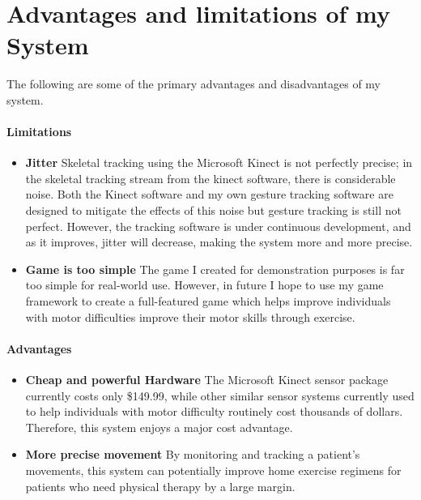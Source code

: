 \documentclass{article}
\begin{document}
\section{Advantages and limitations of my System}

The following are some of the primary advantages and disadvantages of my system.

\paragraph{Limitations}

\begin{itemize}
	\item \textbf{Jitter} Skeletal tracking using the Microsoft Kinect is not perfectly precise; in the skeletal tracking stream from the kinect software, there is considerable noise. Both the Kinect software and my own gesture tracking software are designed to mitigate the effects of this noise but gesture tracking is still not perfect. However, the tracking software is under continuous development, and as it improves, jitter will decrease, making the system more and more precise.

	\item \textbf{Game is too simple} The game I created for demonstration purposes is far too simple for real-world use. However, in future I hope to use my game framework to create a full-featured game which helps improve individuals with motor difficulties improve their motor skills through exercise.
\end{itemize}

\paragraph{Advantages}

\begin{itemize}
	\item \textbf{Cheap and powerful Hardware} The Microsoft Kinect sensor package currently costs only \$149.99, while other similar sensor systems currently used to help individuals with motor difficulty routinely cost thousands of dollars. Therefore, this system enjoys a major cost advantage.

	\item \textbf{More precise movement} By monitoring and tracking a patient's movements, this system can potentially improve home exercise regimens for patients who need physical therapy by a large margin. 
\end{itemize}
\end{document}
